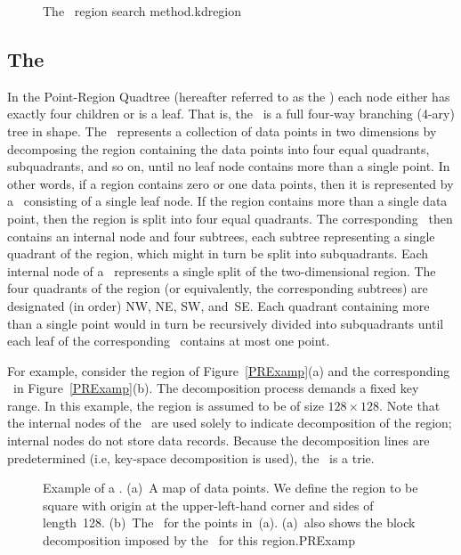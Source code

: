 \begin{figure}
\vspace{-\medskipamount}
{The \KDtree\ region search method.}{kdregion}
\end{figure}

\subsection{The \PRquad}

In the Point-Region Quadtree (hereafter referred to as the \PRquad)
each node either has exactly four children or is a leaf.
That is, the \PRquad\ is a full four-way branching
(4-ary) tree in shape.
The \PRquad\ represents a collection of data points in two dimensions
by decomposing the region containing the data points
into four equal quadrants, subquadrants, and so on, until no leaf node
contains more than a single point.
In other words, if a region contains zero or one data points, then it
is represented by a \PRquad\ consisting of a single leaf node.
If the region contains more than a single data point, then the region
is split into four equal quadrants.
The corresponding \PRquad\ then contains an internal node and four
subtrees, each subtree representing a single quadrant of the region,
which might in turn be split into subquadrants.
Each internal node of a \PRquad\ represents a single split
of the two-dimensional region.
The four quadrants of the region (or equivalently, the corresponding
subtrees) are designated (in order) NW, NE, SW, and~SE.
Each quadrant containing more than a single point would
in turn be recursively divided into subquadrants until each leaf of
the corresponding \PRquad\ contains at most one point.

For example, consider the region of Figure~\ref{PRExamp}(a)
and the corresponding \PRquad\ in Figure~\ref{PRExamp}(b).
The decomposition process demands a fixed key range.
In this example, the region is assumed to be of size
$128 \times 128$.
Note that the internal nodes of the \PRquad\ are used solely to
indicate decomposition of the region; internal nodes do not store data
records.
Because the decomposition lines are predetermined (i.e, key-space
decomposition is used), the \PRquad\ is a trie.

\begin{figure}
\vspace{-\medskipamount}
\vspace{-\smallskipamount}
{Example of a \PRquad.
(a)~A map of data points.
We define the region to be square with origin at the upper-left-hand
corner and sides of length~128.
(b)~The \PRquad\ for the points in~(a).
(a)~also shows the block decomposition imposed by the \PRquad\ for
this region.}{PRExamp}
\bigskip
\end{figure}

